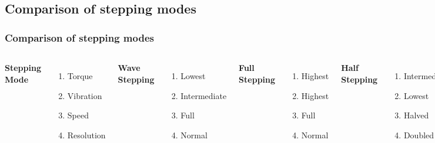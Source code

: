 \documentclass[table,10pt,red]{beamer}	%
\begin{document}
\subsection{Comparison of stepping modes}

\begin{frame}
	\frametitle{Comparison of stepping modes}
	\pause
	\begin{columns}[t]
		\textbf{Stepping Mode}
		\begin{enumerate}
			\item Torque
			\item Vibration
			\item Speed
			\item Resolution
		\end{enumerate}
		
		
		\textbf{Wave Stepping}
		\begin{enumerate}
			\item Lowest
			\item Intermediate
			\item Full
			\item Normal
		\end{enumerate}
		
		\textbf{Full Stepping}
		\begin{enumerate}
			\item Highest
			\item Highest
			\item Full
			\item Normal
		\end{enumerate}
		
		\textbf{Half Stepping}
		\begin{enumerate}
			\item Intermediate
			\item Lowest
			\item Halved
			\item Doubled
		\end{enumerate}
		
	\end{columns}
	

\end{frame}
\end{document}
